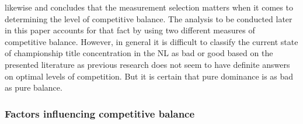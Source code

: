 \documentclass[12pt, a4paper]{article}
\begin{document}
likewise and concludes that the measurement selection matters when it comes to determining the level of competitive balance. The analysis to be conducted later in this paper accounts for that fact by using two different measures of competitive balance. However, in general it is difficult to classify the current state of championship title concentration in the NL as bad or good based on the presented literature as previous research does not seem to have definite answers on optimal levels of competition. But it is certain that pure dominance is as bad as pure balance.

\subsubsection{Factors influencing competitive balance}
\end{document}
